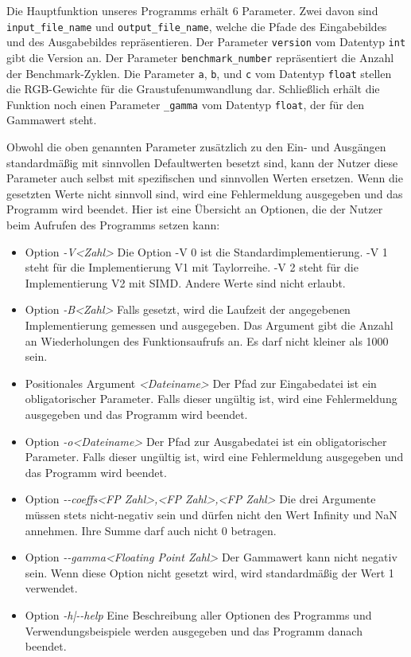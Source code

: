 \documentclass[course=erap]{aspdoc}
\begin{document}
\par
Die Hauptfunktion unseres Programms erhält 6 Parameter. Zwei davon sind \texttt{input\_file\_name} und \texttt{output\_file\_name}, welche die Pfade des Eingabebildes und des Ausgabebildes repräsentieren. Der Parameter \texttt{version} vom Datentyp \texttt{int} gibt die Version an. Der Parameter \texttt{benchmark\_number} repräsentiert die Anzahl der Benchmark-Zyklen. Die Parameter \texttt{a}, \texttt{b}, und \texttt{c} vom Datentyp \texttt{float} stellen die RGB-Gewichte für die Graustufenumwandlung dar. Schließlich erhält die Funktion noch einen Parameter \texttt{\_gamma} vom Datentyp \texttt{float}, der für den Gammawert steht.

\par
Obwohl die oben genannten Parameter zusätzlich zu den Ein- und Ausgängen standardmäßig mit sinnvollen Defaultwerten besetzt sind, kann der Nutzer diese Parameter auch selbst mit spezifischen und sinnvollen Werten ersetzen. Wenn die gesetzten Werte nicht sinnvoll sind, wird eine Fehlermeldung ausgegeben und das Programm wird beendet. Hier ist eine Übersicht an Optionen, die der Nutzer beim Aufrufen des Programms setzen kann:

\begin{itemize}
\item Option \emph{-V<Zahl>} Die Option -V 0 ist die Standardimplementierung. -V 1 steht für die Implementierung V1 mit Taylorreihe. -V 2 steht für die Implementierung V2 mit SIMD. Andere Werte sind nicht erlaubt.
\item Option \emph{-B<Zahl>} Falls gesetzt, wird die Laufzeit der angegebenen Implementierung gemessen und ausgegeben. Das Argument gibt die Anzahl an Wiederholungen des Funktionsaufrufs an. Es darf nicht kleiner als 1000 sein.
\item Positionales Argument \emph{<Dateiname>} Der Pfad zur Eingabedatei ist ein obligatorischer Parameter. Falls dieser ungültig ist, wird eine Fehlermeldung ausgegeben und das Programm wird beendet.
\item Option \emph{-o<Dateiname>} Der Pfad zur Ausgabedatei ist ein obligatorischer Parameter. Falls dieser ungültig ist, wird eine Fehlermeldung ausgegeben und das Programm wird beendet.
\item Option \emph{-{}-coeffs<FP Zahl>,<FP Zahl>,<FP Zahl>} Die drei Argumente müssen stets nicht-negativ sein und dürfen nicht den Wert Infinity und NaN annehmen. Ihre Summe darf auch nicht 0 betragen.
\item Option \emph{-{}-gamma<Floating Point Zahl>} Der Gammawert kann nicht negativ sein. Wenn diese Option nicht gesetzt wird, wird standardmäßig der Wert 1 verwendet.
\item Option \emph{-h|-{}-help} Eine Beschreibung aller Optionen des Programms und Verwendungsbeispiele werden ausgegeben und das Programm danach beendet. 
\end{itemize}
\end{document}
